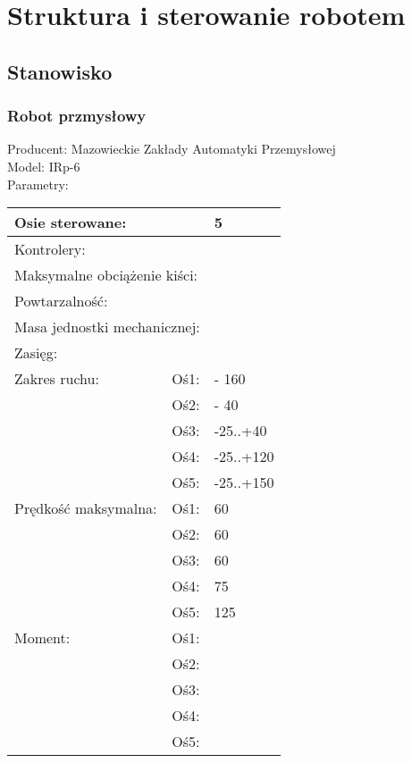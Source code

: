 \chapter{Struktura i sterowanie robotem}
\label{cha:strukturaISterowanie}

\section{Stanowisko}
\label{sec:stanowisko}

\subsection{Robot przmysłowy}
\label{sebsec:RobotPrzemyslowy}
\noindent Producent: Mazowieckie Zakłady Automatyki Przemysłowej\\
Model: IRp-6\\
Parametry:\\
\begin{tabular}{|l|l|l|} \hline
\multicolumn{2}{|l|}{Osie sterowane: }& 5 \\ \hline
\multicolumn{2}{|l|}{Kontrolery: }& \\ \hline
\multicolumn{2}{|l|}{Maksymalne obciążenie kiści: } & \\ \hline
\multicolumn{2}{|l|}{Powtarzalność: }& \\ \hline
\multicolumn{2}{|l|}{Masa jednostki mechanicznej: }& \\ \hline
\multicolumn{2}{|l|}{Zasięg: }& \\ \hline
{Zakres ruchu:} & {Oś1:} & \+- 160 \\ \cline{2-3}
& Oś2: & \+- 40 \\ \cline{2-3}
& Oś3: & -25..+40\\ \cline{2-3}
& Oś4: & -25..+120\\ \cline{2-3}
& Oś5: & -25..+150\\ \hline
Prędkość maksymalna: & Oś1: & 60 \\ \cline{2-3}
& Oś2: & 60 \\ \cline{2-3}
& Oś3: & 60 \\ \cline{2-3}
& Oś4: & 75 \\ \cline{2-3}
& Oś5: & 125\\ \hline
Moment: & Oś1: & \\ \cline{2-3}
& Oś2: & \\ \cline{2-3}
& Oś3: & \\ \cline{2-3}
& Oś4: & \\ \cline{2-3}
& Oś5: & \\ \hline
\end{tabular}

